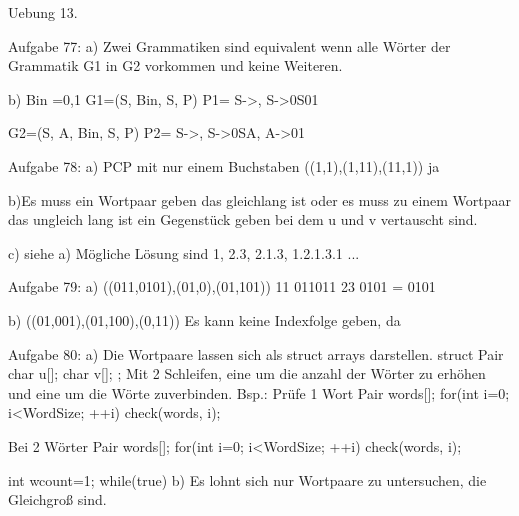Uebung 13.

Aufgabe 77:
a)
Zwei Grammatiken sind equivalent wenn alle Wörter der Grammatik G1 in G2 vorkommen
und keine Weiteren.

b)
\Sigma Bin ={0,1} G1=(S, \Sigma Bin, S, P) 
P1={
S->\epsilon,
S->0S01
}

G2=({S, A}, \Sigma Bin, S, P)
P2={
S->\epsilon,
S->0SA,
A->01
}


Aufgabe 78:
a)
PCP mit nur einem Buchstaben
((1,1),(1,11),(11,1))
ja

b)Es muss ein Wortpaar geben das gleichlang ist oder es muss zu einem Wortpaar das ungleich lang ist ein Gegenstück geben bei dem u und v vertauscht sind.

c)
siehe a) Mögliche Lösung sind 1, 2.3, 2.1.3, 1.2.1.3.1 ...


Aufgabe 79:
a) ((011,0101),(01,0),(01,101))
11 011011
23 0101 = 0101

b) ((01,001),(01,100),(0,11))
Es kann keine Indexfolge geben, da 


Aufgabe 80:
a)
Die Wortpaare lassen sich als struct arrays darstellen.
struct Pair{
char u[];
char v[];
};
Mit 2 Schleifen, eine um die anzahl der Wörter zu erhöhen und eine um die Wörte zuverbinden.
Bsp.: Prüfe 1 Wort
Pair words[];
for(int i=0; i<WordSize; ++i) check(words, i);

Bei 2 Wörter
Pair words[];
for(int i=0; i<WordSize; ++i) check(words, i);

int wcount=1;
while(true)
{
}
b) Es lohnt sich nur Wortpaare zu untersuchen, die Gleichgroß sind.